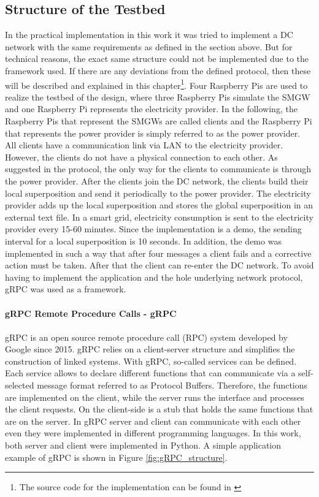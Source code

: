 \subsection{Structure of the Testbed}
In the practical implementation in this work it was tried to implement a DC network with the same requirements as defined in the section above. But for technical reasons, the exact same structure could not be implemented due to the framework used. If there are any deviations from the defined protocol, then these will be described and explained in this chapter\footnote[5]{The source code for the implementation can be found in \cite{Impl}}.
Four Raspberry Pis are used to realize the testbed of the design, where three Raspberry Pis simulate the \gls{SMGW} and one Raspberry Pi represents the electricity provider. In the following, the Raspberry Pis that represent the \gls{SMGW}s are called clients and the Raspberry Pi that represents the power provider is simply referred to as the power provider. All clients have a communication link via \gls{LAN} to the electricity provider. However, the clients do not have a physical connection to each other. As suggested in the protocol, the only way for the clients to communicate is through the power provider. After the clients join the DC network, the clients build their local superposition and send it periodically to the power provider. The electricity provider adds up the local superposition and stores the global superposition in an external text file. In a smart grid, electricity consumption is sent to the electricity provider every 15-60 minutes. Since the implementation is a demo, the sending interval for a local superposition is 10 seconds. In addition, the demo was implemented in such a way that after four messages a client fails and a corrective action must be taken. After that the client can re-enter the DC network. To avoid having to implement the application and the hole underlying network protocol, gRPC was used as a framework.\\
\\
\textbf{gRPC Remote Procedure Calls - gRPC}
\\
\\
gRPC \cite{gRPC} is an open source remote procedure call (RPC) system developed by Google since 2015. gRPC relies on a client-server structure and simplifies the construction of linked systems. With gRPC, so-called services can be defined. Each service allows to declare different functions that can communicate via a self-selected message format referred to as Protocol Buffers. Therefore, the functions are implemented on the client, while the server runs the interface and processes the client requests. On the client-side is a stub that holds the same functions that are on the server. In gRPC server and client can communicate with each other even they were implemented in different programming languages. In this work, both server and client were implemented in Python. A simple application example of gRPC is shown in Figure \ref{fig:gRPC_structure}.
